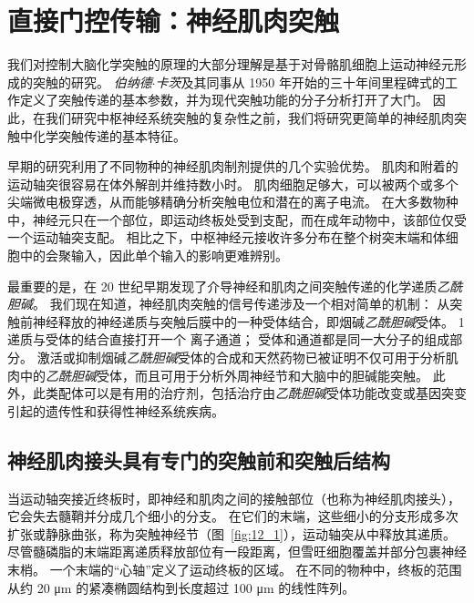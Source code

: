 \chapter{直接门控传输：神经肌肉突触} \label{chap:chap12}


我们对控制大脑化学突触的原理的大部分理解是基于对骨骼肌细胞上运动神经元形成的突触的研究。
\textit{伯纳德$\cdot$卡茨}及其同事从 1950 年开始的三十年间里程碑式的工作定义了突触传递的基本参数，并为现代突触功能的分子分析打开了大门。
因此，在我们研究中枢神经系统突触的复杂性之前，我们将研究更简单的神经肌肉突触中化学突触传递的基本特征。


早期的研究利用了不同物种的神经肌肉制剂提供的几个实验优势。
肌肉和附着的运动轴突很容易在体外解剖并维持数小时。
肌肉细胞足够大，可以被两个或多个尖端微电极穿透，从而能够精确分析突触电位和潜在的离子电流。
在大多数物种中，神经元只在一个部位，即运动终板处受到支配，而在成年动物中，该部位仅受一个运动轴突支配。
相比之下，中枢神经元接收许多分布在整个树突末端和体细胞中的会聚输入，因此单个输入的影响更难辨别。


最重要的是，在 20 世纪早期发现了介导神经和肌肉之间突触传递的化学递质\textit{乙酰胆碱}。
我们现在知道，神经肌肉突触的信号传递涉及一个相对简单的机制：
从突触前神经释放的神经递质与突触后膜中的一种受体结合，即烟碱\textit{乙酰胆碱}受体。
1 递质与受体的结合直接打开一个 离子通道；
受体和通道都是同一大分子的组成部分。
激活或抑制烟碱\textit{乙酰胆碱}受体的合成和天然药物已被证明不仅可用于分析肌肉中的\textit{乙酰胆碱}受体，而且可用于分析外周神经节和大脑中的胆碱能突触。
此外，此类配体可以是有用的治疗剂，包括治疗由\textit{乙酰胆碱}受体功能改变或基因突变引起的遗传性和获得性神经系统疾病。



\section{神经肌肉接头具有专门的突触前和突触后结构}

当运动轴突接近终板时，即神经和肌肉之间的接触部位（也称为神经肌肉接头），它会失去髓鞘并分成几个细小的分支。
在它们的末端，这些细小的分支形成多次扩张或静脉曲张，称为突触神经节（图~\ref{fig:12_1}），运动轴突从中释放其递质。
尽管髓磷脂的末端距离递质释放部位有一段距离，但雪旺细胞覆盖并部分包裹神经末梢。
一个末端的“心轴”定义了运动终板的区域。
在不同的物种中，终板的范围从约 20 μm 的紧凑椭圆结构到长度超过 100 μm 的线性阵列。


